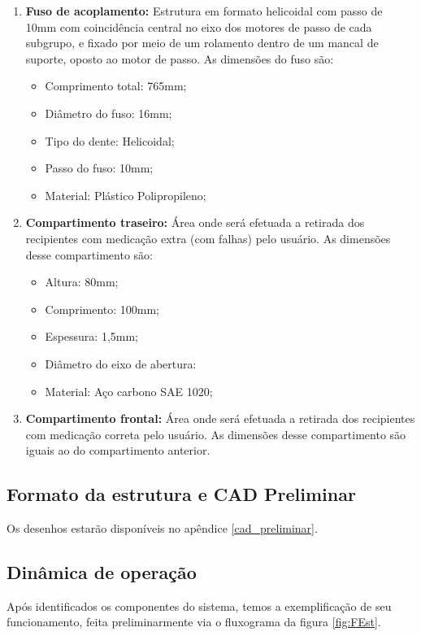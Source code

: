 \begin{enumerate}
\item \textbf{Fuso de acoplamento:} Estrutura em formato helicoidal com passo de 10mm com coincidência central no eixo dos motores de passo de cada subgrupo, e fixado por meio de um rolamento dentro de um mancal de suporte, oposto ao motor de passo. As dimensões do fuso são:
\begin{itemize}
    \item Comprimento total: 765mm;
    \item Diâmetro do fuso: 16mm;
    \item Tipo do dente: Helicoidal;
    \item Passo do fuso: 10mm;
    \item Material: Plástico Polipropileno;
\end{itemize}
\item \textbf{Compartimento traseiro:} Área onde será efetuada a retirada dos recipientes com medicação extra (com falhas) pelo usuário. As dimensões desse compartimento são:
\begin{itemize}
    \item Altura: 80mm;
    \item Comprimento: 100mm;
    \item Espessura: 1,5mm;
    \item Diâmetro do eixo de abertura:
    \item Material: Aço carbono SAE 1020;
\end{itemize}
\item \textbf{Compartimento frontal:} Área onde será efetuada a retirada dos recipientes com medicação correta pelo usuário. As dimensões desse compartimento são iguais ao do compartimento anterior.
\end{enumerate}



\subsection{Formato da estrutura e CAD Preliminar}
Os desenhos estarão disponíveis no apêndice \ref{cad_preliminar}.

\subsection{Dinâmica de operação}

Após identificados os componentes do sistema, temos a exemplificação de seu funcionamento, feita preliminarmente via o fluxograma da figura \ref{fig:FEst}.

